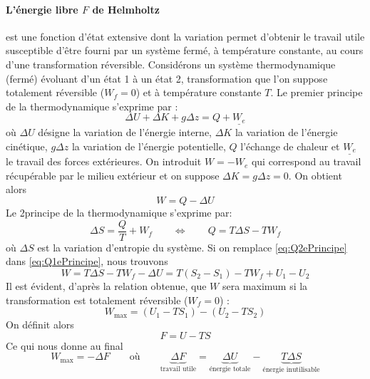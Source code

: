 \paragraph{L'énergie libre $F$ de Helmholtz} est une fonction d'état extensive dont la variation permet d'obtenir le travail utile susceptible d'être fourni par un système fermé, à température constante, au cours d'une transformation réversible. 
Considérons un système thermodynamique (fermé) évoluant d'un état 1 à un état 2, transformation que l'on suppose totalement réversible ($W_f = 0$) et à température constante $T$. Le premier principe de la thermodynamique s'exprime par :
\begin{equation} \Delta U + \Delta K + g\Delta z = Q + \underline{W_e} \end{equation}
où $\Delta U$ désigne la variation de l'énergie interne, $\Delta K$ la variation de l'énergie cinétique, $g\Delta z$ la variation de l'énergie potentielle, $Q$ l'échange de chaleur et $\underline{W_e}$ le travail des forces extérieures. On introduit $W = -W_e$ qui correspond au travail récupérable par le milieu extérieur et on suppose $\Delta K = g\Delta z = 0$. On obtient alors
\begin{equation} W = Q - \Delta U \label{eq:Q1ePrincipe}\end{equation}
Le 2\ieme principe de la thermodynamique s'exprime par:
\begin{equation} \Delta S = \frac{Q}{T} + W_f \qquad\Leftrightarrow\qquad Q = T\Delta S - TW_f \label{eq:Q2ePrincipe}\end{equation}
où $\Delta S$ est la variation d'entropie du système. Si on remplace \ref{eq:Q2ePrincipe} dans \ref{eq:Q1ePrincipe}, nous trouvons
\begin{equation} W = T\Delta S - TW_f - \Delta U = T(S_2 - S_1) - TW_f + U_1 - U_2 \end{equation}
Il est évident, d'après la relation obtenue, que $W$ sera maximum si la transformation est totalement réversible ($W_f = 0$) :
\begin{equation} W_\text{max} = (U_1 - TS_1)-(U_2-TS_2)\end{equation}
On définit alors 
\begin{equation} F = U - TS \end{equation} 
Ce qui nous donne au final 
\begin{equation} W_\text{max} = -\Delta F \qquad\text{où}\qquad \underbrace{\Delta F}_\text{travail utile} = \underbrace{\Delta U}_\text{énergie totale} - \underbrace{T\Delta S}_\text{énergie inutilisable}\end{equation}


